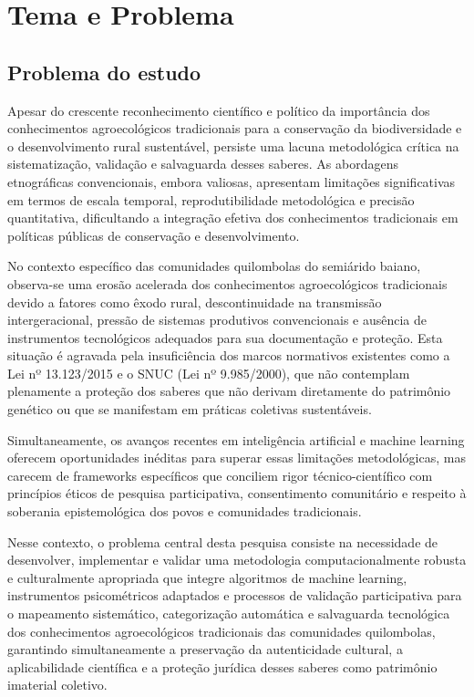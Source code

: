 \section{Tema e Problema}
\subsection{Problema do estudo}

Apesar do crescente reconhecimento científico e político da importância dos conhecimentos agroecológicos tradicionais para a conservação da biodiversidade e o desenvolvimento rural sustentável, persiste uma lacuna metodológica crítica na sistematização, validação e salvaguarda desses saberes. As abordagens etnográficas convencionais, embora valiosas, apresentam limitações significativas em termos de escala temporal, reprodutibilidade metodológica e precisão quantitativa, dificultando a integração efetiva dos conhecimentos tradicionais em políticas públicas de conservação e desenvolvimento.

No contexto específico das comunidades quilombolas do semiárido baiano, observa-se uma erosão acelerada dos conhecimentos agroecológicos tradicionais devido a fatores como êxodo rural, descontinuidade na transmissão intergeracional, pressão de sistemas produtivos convencionais e ausência de instrumentos tecnológicos adequados para sua documentação e proteção. Esta situação é agravada pela insuficiência dos marcos normativos existentes como a Lei nº 13.123/2015 e o SNUC (Lei nº 9.985/2000), que não contemplam plenamente a proteção dos saberes que não derivam diretamente do patrimônio genético ou que se manifestam em práticas coletivas sustentáveis.

Simultaneamente, os avanços recentes em inteligência artificial e machine learning oferecem oportunidades inéditas para superar essas limitações metodológicas, mas carecem de frameworks específicos que conciliem rigor técnico-científico com princípios éticos de pesquisa participativa, consentimento comunitário e respeito à soberania epistemológica dos povos e comunidades tradicionais.

Nesse contexto, o problema central desta pesquisa consiste na necessidade de desenvolver, implementar e validar uma metodologia computacionalmente robusta e culturalmente apropriada que integre algoritmos de machine learning, instrumentos psicométricos adaptados e processos de validação participativa para o mapeamento sistemático, categorização automática e salvaguarda tecnológica dos conhecimentos agroecológicos tradicionais das comunidades quilombolas, garantindo simultaneamente a preservação da autenticidade cultural, a aplicabilidade científica e a proteção jurídica desses saberes como patrimônio imaterial coletivo.
